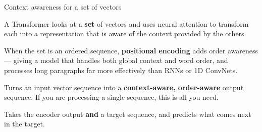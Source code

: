 \documentclass[aspectratio=169,11pt,t]{beamer}
\begin{document}
\begin{frame}[shrink=25]{Context awareness for a set of vectors}
{\fontsize{9.4}{12.6}\selectfont\color{fg2}A Transformer looks at a \textbf{set} of vectors and uses neural attention to transform each into a representation that is aware of the context provided by the others.\par}\vskip 4pt
{\fontsize{9.4}{12.6}\selectfont\color{fg2}When the set is an ordered sequence, \textbf{positional encoding} adds order awareness --- giving a model that handles both global context and word order, and processes long paragraphs far more effectively than RNNs or 1D ConvNets.\par}\vskip 4pt
\begin{minipage}[t]{0.494\textwidth}
\begin{icardaccent}
Turns an input vector sequence into a \textbf{context-aware, order-aware} output sequence. If you are processing a single sequence, this is all you need.
\end{icardaccent}
\end{minipage}%
\hfill
\begin{minipage}[t]{0.494\textwidth}
\begin{icardaccent}
Takes the encoder output \textbf{and} a target sequence, and predicts what comes next in the target.
\end{icardaccent}
\end{minipage}%
\end{frame}
\end{document}
